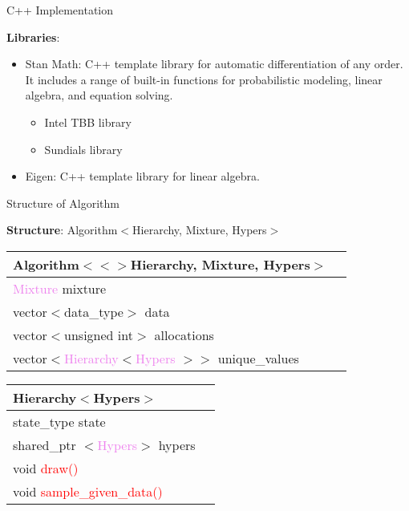 \begin{frame}{C++ Implementation}

\textbf{Libraries}:
\begin{itemize}
		\item Stan Math: C++ template library for automatic differentiation of any order. It includes a range of built-in functions for probabilistic modeling, linear algebra, and equation solving.
		\begin{itemize}
			\item Intel TBB library
			\item  Sundials library
		\end{itemize}
		\item Eigen: C++ template library for linear algebra.
		
\end{itemize}
\end{frame}

\begin{frame}{Structure of Algorithm}

\textbf{Structure}:
 Algorithm$<$Hierarchy, Mixture, Hypers$>$
\begin{center}
\begin{tabular}{ | l | c| } 
\hline
 Algorithm$<<>$Hierarchy, Mixture, Hypers$>$ \\
\hline
 \textcolor{violet}{Mixture} mixture\\
 vector$<$data\_type$>$ data  \\ 
 vector$<$unsigned int$>$ allocations  \\
 vector$<$\textcolor{violet}{Hierarchy}$<$\textcolor{violet}{Hypers} $>>$ unique\_values \\
\hline
\end{tabular}
\end{center}



\begin{center}
\begin{tabular}{ | l | c| } 
\hline
Hierarchy$<$Hypers$>$ \\
\hline
 state\_type state  \\ 
 shared\_ptr $<$\textcolor{violet}{Hypers}$>$ hypers \\
 void \textcolor{red}{draw()} \\
 void \textcolor{red}{sample\_given\_data()} \\
\hline
\end{tabular}
\end{center}

	
\end{frame}



